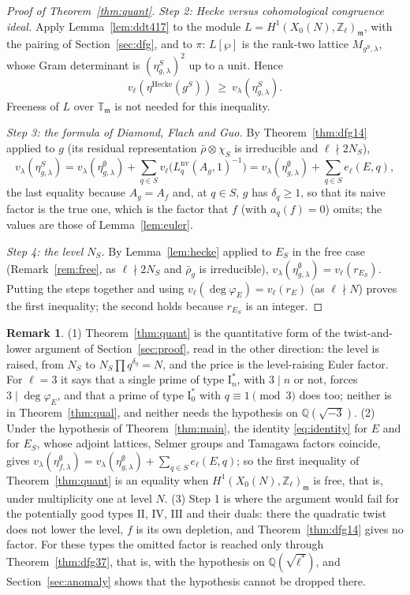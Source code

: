 \documentclass[11pt]{amsart}
\theoremstyle{definition}
\newtheorem{remark}[theorem]{Remark}
\newcommand{\Q}{\mathbb{Q}}
\newcommand{\Z}{\mathbb{Z}}
\newcommand{\T}{\mathbb{T}}
\newcommand{\degphi}{\deg\varphi_E}
\newcommand{\nv}{\mathrm{nv}}
\begin{document}
\begin{proof}[Proof of Theorem~\ref{thm:quant}]
\emph{Step 2: Hecke versus cohomological congruence ideal.} Apply Lemma~\ref{lem:ddt417} to the module $L=H^1(X_0(N),\Z_\ell)_{\mathfrak m}$, with the pairing of Section~\ref{sec:dfg}, and to $\pi$: $L[\wp]$ is the rank-two lattice $M_{g^S,\lambda}$, whose Gram determinant is $(\eta^S_{g,\lambda})^2$ up to a unit. Hence
\[
v_\ell(\eta^{\mathrm{Hecke}}(g^S))\ \ge\ v_\lambda(\eta^S_{g,\lambda}).
\]
Freeness of $L$ over $\T_{\mathfrak m}$ is not needed for this inequality.

\emph{Step 3: the formula of Diamond, Flach and Guo.} By Theorem~\ref{thm:dfg14} applied to $g$ (its residual representation $\bar\rho\otimes\chi_S$ is irreducible and $\ell\nmid 2N_S$),
\[
v_\lambda(\eta^S_{g,\lambda})=v_\lambda(\eta^\emptyset_{g,\lambda})+\sum_{q\in S}v_\ell\bigl(L_q^{\nv}(A_g,1)^{-1}\bigr)=v_\lambda(\eta^\emptyset_{g,\lambda})+\sum_{q\in S}e_\ell(E,q),
\]
the last equality because $A_g=A_f$ and, at $q\in S$, $g$ has $\delta_q\ge1$, so that its naive factor is the true one, which is the factor that $f$ (with $a_q(f)=0$) omits; the values are those of Lemma~\ref{lem:euler}.

\emph{Step 4: the level $N_S$.} By Lemma~\ref{lem:hecke} applied to $E_S$ in the free case (Remark~\ref{rem:free}, as $\ell\nmid2N_S$ and $\bar\rho_g$ is irreducible), $v_\lambda(\eta^\emptyset_{g,\lambda})=v_\ell(r_{E_S})$. Putting the steps together and using $v_\ell(\degphi)=v_\ell(r_E)$ (as $\ell\nmid N$) proves the first inequality; the second holds because $r_{E_S}$ is an integer.
\end{proof}

\begin{remark}
(1) Theorem~\ref{thm:quant} is the quantitative form of the twist-and-lower argument of Section~\ref{sec:proof}, read in the other direction: the level is raised, from $N_S$ to $N_S\prod q^{\delta_q}=N$, and the price is the level-raising Euler factor. For $\ell=3$ it says that a single prime of type $\mathrm{I}_n^*$, with $3\mid n$ or not, forces $3\mid\degphi$, and that a prime of type $\mathrm{I}_0^*$ with $q\equiv1\pmod3$ does too; neither is in Theorem~\ref{thm:qual}, and neither needs the hypothesis on $\Q(\sqrt{-3})$. (2) Under the hypothesis of Theorem~\ref{thm:main}, the identity \eqref{eq:identity} for $E$ and for $E_S$, whose adjoint lattices, Selmer groups and Tamagawa factors coincide, gives $v_\lambda(\eta^\emptyset_{f,\lambda})=v_\lambda(\eta^\emptyset_{g,\lambda})+\sum_{q\in S}e_\ell(E,q)$; so the first inequality of Theorem~\ref{thm:quant} is an equality when $H^1(X_0(N),\Z_\ell)_{\mathfrak m}$ is free, that is, under multiplicity one at level $N$. (3) Step 1 is where the argument would fail for the potentially good types $\mathrm{II}$, $\mathrm{IV}$, $\mathrm{III}$ and their duals: there the quadratic twist does not lower the level, $f$ is its own depletion, and Theorem~\ref{thm:dfg14} gives no factor. For these types the omitted factor is reached only through Theorem~\ref{thm:dfg37}, that is, with the hypothesis on $\Q(\sqrt{\ell^*})$, and Section~\ref{sec:anomaly} shows that the hypothesis cannot be dropped there.
\end{remark}
\end{document}
